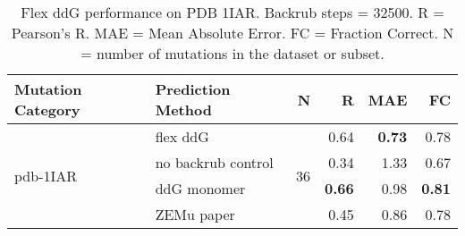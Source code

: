 \begin{table}
  \begin{tabular}{llrrrr}
\toprule
Mutation Category &   Prediction Method &   N &    R &  MAE &   FC \\
\midrule
 \multirow{ 4}{*}{pdb-1IAR} & flex ddG & \multirow{ 4}{*}{36} & 0.64 & \textbf{0.73} & 0.78  \\
 & no backrub control & & 0.34 & 1.33 & 0.67  \\
 & ddG monomer & & \textbf{0.66} & 0.98 & \textbf{0.81}  \\
 & ZEMu paper & & 0.45 & 0.86 & 0.78  \\
\bottomrule
\end{tabular}
  \caption[Flex ddG performance on PDB 1IAR]{
    Flex ddG performance on PDB 1IAR. Backrub steps = 32500. R = Pearson's R. MAE = Mean Absolute Error. FC = Fraction Correct. N = number of mutations in the dataset or subset.
  } \label{tab:table-pdb-1IAR}
\end{table}
